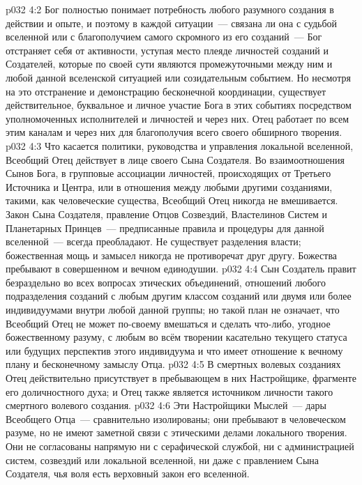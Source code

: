 \vs p032 4:2 Бог полностью понимает потребность любого разумного создания в действии и опыте, и поэтому в каждой ситуации~--- связана ли она с судьбой вселенной или с благополучием самого скромного из его созданий~--- Бог отстраняет себя от активности, уступая место плеяде личностей созданий и Создателей, которые по своей сути являются промежуточными между ним и любой данной вселенской ситуацией или созидательным событием. Но несмотря на это отстранение и демонстрацию бесконечной координации, существует действительное, буквальное и личное участие Бога в этих событиях посредством уполномоченных исполнителей и личностей и через них. Отец работает по всем этим каналам и через них для благополучия всего своего обширного творения.
\vs p032 4:3 \pc Что касается политики, руководства и управления локальной вселенной, Всеобщий Отец действует в лице своего Сына Создателя. Во взаимоотношения Сынов Бога, в групповые ассоциации личностей, происходящих от Третьего Источника и Центра, или в отношения между любыми другими созданиями, такими, как человеческие существа, Всеобщий Отец никогда не вмешивается. Закон Сына Создателя, правление Отцов Созвездий, Властелинов Систем и Планетарных Принцев~--- предписанные правила и процедуры для данной вселенной~--- всегда преобладают. Не существует разделения власти; божественная мощь и замысел никогда не противоречат друг другу. Божества пребывают в совершенном и вечном единодушии.
\vs p032 4:4 Сын Создатель правит безраздельно во всех вопросах этических объединений, отношений любого подразделения созданий с любым другим классом созданий или двумя или более индивидуумами внутри любой данной группы; но такой план не означает, что Всеобщий Отец не может по\hyp{}своему вмешаться и сделать что\hyp{}либо, угодное божественному разуму, с любым  во всём творении касательно текущего статуса или будущих перспектив этого индивидуума и что имеет отношение к вечному плану и бесконечному замыслу Отца.
\vs p032 4:5 \pc В смертных волевых созданиях Отец действительно присутствует в пребывающем в них Настройщике, фрагменте его доличностного духа; и Отец также является источником личности такого смертного волевого создания.
\vs p032 4:6 \pc Эти Настройщики Мыслей~--- дары Всеобщего Отца~--- сравнительно изолированы; они пребывают в человеческом разуме, но не имеют заметной связи с этическими делами локального творения. Они не согласованы напрямую ни с серафической службой, ни с администрацией систем, созвездий или локальной вселенной, ни даже с правлением Сына Создателя, чья воля есть верховный закон его вселенной.
